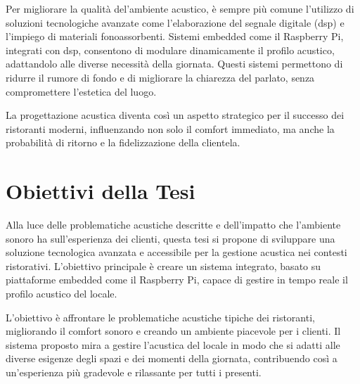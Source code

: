 Per migliorare la qualità del'ambiente acustico, è sempre più comune l'utilizzo di soluzioni tecnologiche avanzate come l'elaborazione del segnale digitale (\gls{dsp}) e l'impiego di materiali fonoassorbenti. Sistemi embedded come il Raspberry Pi, integrati con \gls{dsp}, consentono di modulare dinamicamente il profilo acustico, adattandolo alle diverse necessità della giornata. Questi sistemi permettono di ridurre il rumore di fondo e di migliorare la chiarezza del parlato, senza compromettere l'estetica del luogo. 

La progettazione acustica diventa così un aspetto strategico per il successo dei ristoranti moderni, influenzando non solo il comfort immediato, ma anche la probabilità di ritorno e la fidelizzazione della clientela.

\section{Obiettivi della Tesi}
\noindent

Alla luce delle problematiche acustiche descritte e dell'impatto che l'ambiente sonoro ha sull'esperienza dei clienti, questa tesi si propone di sviluppare una soluzione tecnologica avanzata e accessibile per la gestione acustica nei contesti ristorativi. L'obiettivo principale è creare un sistema integrato, basato su piattaforme embedded come il Raspberry Pi, capace di gestire in tempo reale il profilo acustico del locale.

L'obiettivo è affrontare le problematiche acustiche tipiche dei ristoranti, migliorando il comfort sonoro e creando un ambiente piacevole per i clienti. Il sistema proposto mira a gestire l'acustica del locale in modo che si adatti alle diverse esigenze degli spazi e dei momenti della giornata, contribuendo così a un'esperienza più gradevole e rilassante per tutti i presenti.